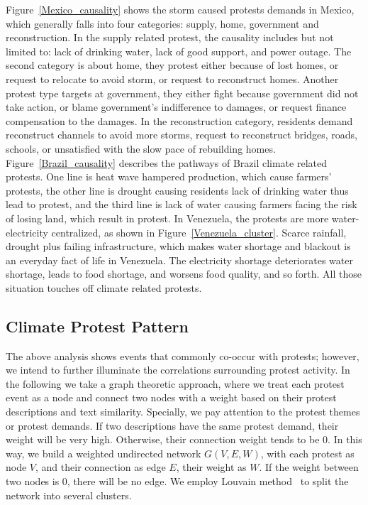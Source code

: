 Figure~\ref{Mexico_causality} shows the storm caused protests demands in Mexico, which generally falls into four categories: supply, home, government and reconstruction. In the supply related protest, the causality includes but not limited to: lack of drinking water, lack of good support, and power outage. The second category is about home, they protest either because of lost homes, or request to relocate to avoid storm, or request to reconstruct homes. Another protest type targets at government, they either fight because government did not take action, or blame government's indifference to damages, or request finance compensation to the damages. In the reconstruction category, residents demand reconstruct channels to avoid more storms, request to reconstruct bridges, roads, schools, or unsatisfied with the slow pace of rebuilding homes. Figure~\ref{Brazil_causality} describes the pathways of Brazil climate related protests. One line is heat wave hampered production, which cause farmers' protests, the other line is drought causing residents lack of drinking water thus lead to protest, and the third line is lack of water causing farmers facing the risk of losing land, which result in protest. In Venezuela, the protests are more water-electricity centralized, as shown in Figure~\ref{Venezuela_cluster}. Scarce rainfall, drought plus failing infrastructure, which makes water shortage and blackout is an everyday fact of life in Venezuela. The electricity shortage deteriorates water shortage, leads to food shortage, and worsens food quality, and so forth. All those situation touches off climate related protests.


\subsection{Climate Protest Pattern}
The above analysis shows events that commonly co-occur with protests; however, we intend to further illuminate the correlations surrounding protest activity.
In the following we take a graph theoretic approach, where we treat each protest event as a node and connect two nodes with a weight based on their protest descriptions and text similarity. Specially, we pay attention to the protest themes or protest demands. If two descriptions have the same protest demand, their weight will be very high. Otherwise, their connection weight tends to be 0.
In this way, we build a weighted undirected network $G(V, E, W)$, with each protest as node $V$, and their connection as edge $E$, their weight as $W$. If the weight between two nodes is 0, there will be no edge. We employ Louvain method~\cite{blondel2008fast} to split the network into several clusters.


